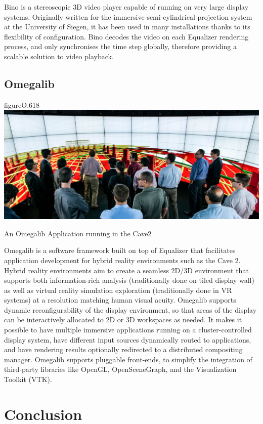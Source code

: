 Bino is a stereoscopic 3D video player capable of running on very large display
systems. Originally written for the immersive semi-cylindrical projection
system at the University of Siegen, it has been used in many installations
thanks to its flexibility of configuration. Bino decodes the video on each
Equalizer rendering process, and only synchronises the time step globally,
therefore providing a scalable solution to video playback.

\section{Omegalib}

\begin{wrapfloat}{figure}{O}{.618\textwidth}
  \includegraphics[width=.618\textwidth]{images/omegalib}
  {\caption{\label{fOmegalib}An Omegalib Application running in the Cave2}}
\end{wrapfloat}

Omegalib \cite{Omegalib} is a software framework built on top of Equalizer that
facilitates application development for hybrid reality environments such as the
Cave 2. Hybrid reality environments aim to create a seamless 2D/3D environment
that supports both information-rich analysis (traditionally done on tiled
display wall) as well as virtual reality simulation exploration (traditionally
done in VR systems) at a resolution matching human visual acuity. Omegalib
supports dynamic reconfigurability of the display environment, so that areas of
the display can be interactively allocated to 2D or 3D workspaces as needed. It
makes it possible to have multiple immersive applications running on a
cluster-controlled display system, have different input sources dynamically
routed to applications, and have rendering results optionally redirected to a
distributed compositing manager. Omegalib supports pluggable front-ends, to
simplify the integration of third-party libraries like OpenGL, OpenSceneGraph,
and the Visualization Toolkit (VTK).


\chapter{Conclusion}\label{sConclusion}

